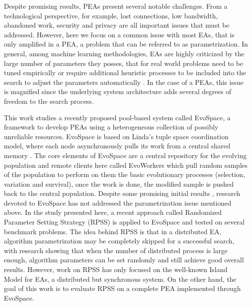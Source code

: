 \documentclass{sig-alternate}
\begin{document}
Despite promising results, PEAs present several notable challenges. From a technological perspective, for example, lost 
connections, low bandwidth, abandoned work, security and privacy are all important issues that must be addressed. 
However, here we focus on a common issue with most EAs, that is only amplified in a PEA, a problem that can be referred to as parametrization.
In general, among machine learning methodologies, EAs are highly criticized by the large number of parameters they posses,
that for real world problems need to be tuned empirically or require additional heuristic processes to be included into the search to
adjust the parameters automatically \cite{ss}.
In the case of a PEAs, this issue is magnified since the underlying system architecture adds several degrees of freedom to the search process.

This work studies a recently proposed pool-based system called EvoSpace, a framework to develop PEAs using 
a heterogeneous collection of possibly unreliable resources.
EvoSpace is based on Linda's tuple space coordination model, where each node asynchronously
pulls its work from a central shared memory  \cite{Evospace,Musart,FreeLunch,Fire}. The core elements of EvoSpace are a central 
repository for the evolving population and remote clients here called EvoWorkers
which pull random samples of the population to perform on them the basic evolutionary
processes (selection, variation and survival), once the work is done, the
modified sample is pushed back to the central population.
Despite some promising initial results \cite{Evospace,Musart,FreeLunch,Fire}, research devoted to EvoSpace has not addressed the parametrization issue mentioned above.
In the study presented here, a recent approach called Randomized Parameter Setting Strategy (RPSS) \cite{fuku1,fuku2} is applied to EvoSpace and tested on several
benchmark problems.
The idea behind RPSS is that in a distributed EA, algorithm parametrization may be completely skipped for a successful search,
with research showing that when the number of distributed process is large enough, algorithm parameters can be set randomly and still achieve
good overall results.
However, work on RPSS has only focused on the well-known Island Model for EAs, a distributed but synchronous system.
On the other hand, the goal of this work is to evaluate RPSS on a complete PEA implemented through EvoSpace.
\end{document}
